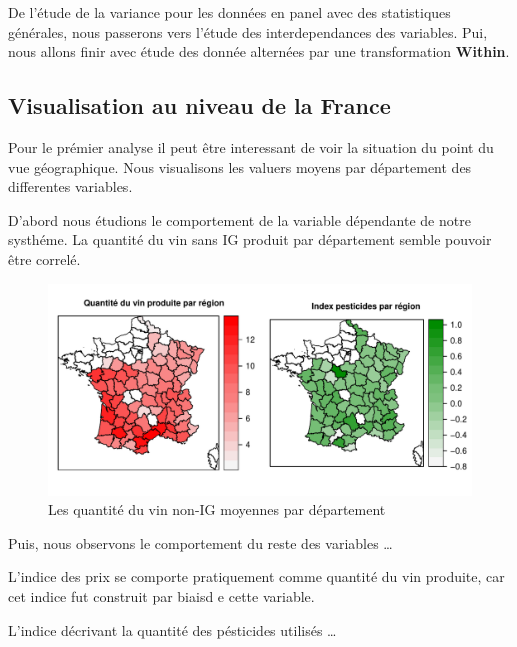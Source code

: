 \documentclass[11pt,]{article}
\begin{document}
De l'étude de la variance pour les données en panel avec des
statistiques générales, nous passerons vers l'étude des interdependances
des variables. Pui, nous allons finir avec étude des donnée alternées
par une transformation \textbf{Within}.

\hypertarget{visualisation-au-niveau-de-la-france}{%
\subsection{Visualisation au niveau de la
France}\label{visualisation-au-niveau-de-la-france}}

Pour le prémier analyse il peut être interessant de voir la situation du
point du vue géographique. Nous visualisons les valuers moyens par
département des differentes variables.

D'abord nous étudions le comportement de la variable dépendante de notre
systhéme. La quantité du vin sans IG produit par département semble
pouvoir être correlé.

\FloatBarrier

\begin{figure}[!htbp]

{\centering \includegraphics{note2pres_files/figure-latex/unnamed-chunk-16-1} 

}

\caption{Les quantité du vin non-IG moyennes par département}\label{fig:unnamed-chunk-16}
\end{figure}

\FloatBarrier

Puis, nous observons le comportement du reste des variables \ldots{}

L'indice des prix se comporte pratiquement comme quantité du vin
produite, car cet indice fut construit par biaisd e cette variable.

L'indice décrivant la quantité des pésticides utilisés \ldots{}
\end{document}
